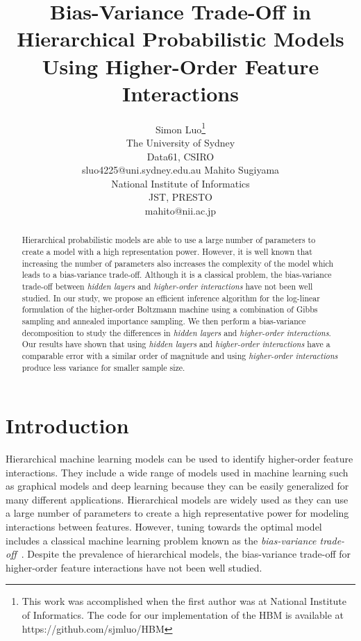 \documentclass[letterpaper]{article} %
\begin{document}
%
\title{Bias-Variance Trade-Off in Hierarchical Probabilistic Models \\Using Higher-Order Feature Interactions  }
\author{Simon Luo\thanks{This work was accomplished when the first author was at National Institute of Informatics. The code for our implementation of the HBM is available at https://github.com/sjmluo/HBM} \\
        The University of Sydney \\
        Data61, CSIRO \\
        sluo4225@uni.sydney.edu.au
        \And 
        Mahito Sugiyama \\
        National Institute of Informatics \\
        JST, PRESTO \\
        mahito@nii.ac.jp
        }
\maketitle
\begin{abstract}
	Hierarchical probabilistic models are able to use a large number of parameters to create a model with a high representation power. However, it is well known that increasing the number of parameters also increases the complexity of the model which leads to a bias-variance trade-off. Although it is a classical problem, the bias-variance trade-off between \textit{hidden layers} and \textit{higher-order interactions} have not been well studied. In our study, we propose an efficient inference algorithm for the log-linear formulation of the higher-order Boltzmann machine using a combination of Gibbs sampling and annealed importance sampling. We then perform a bias-variance decomposition to study the differences in \textit{hidden layers} and \textit{higher-order interactions}. Our results have shown that using \textit{hidden layers} and \textit{higher-order interactions} have a comparable error with a similar order of magnitude and using \textit{higher-order interactions} produce less variance for smaller sample size.    
\end{abstract}

\section{Introduction}
	Hierarchical machine learning models can be used to identify higher-order feature interactions. They include a wide range of models used in machine learning such as graphical models and deep learning because they can be easily generalized for many different applications. Hierarchical models are widely used as they can use a large number of parameters to create a high representative power for modeling interactions between features. However, tuning towards the optimal model includes a classical machine learning problem known as the \emph{bias-variance trade-off}~\cite{friedman2001elements}. Despite the prevalence of hierarchical models, the bias-variance trade-off for higher-order feature interactions have not been well studied.
\end{document}
